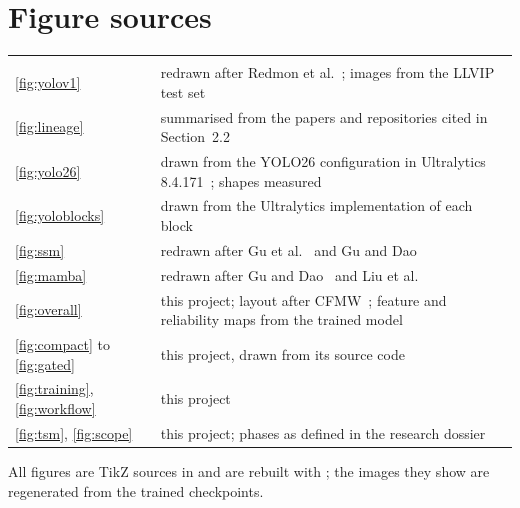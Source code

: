 \chapter{Figure sources}

\begin{longtable}{@{}P{2.6cm}P{11.2cm}@{}}
 &  \\
\ref{fig:yolov1} & redrawn after Redmon et al.~\cite{redmon2016yolo}; images from the LLVIP test set~\cite{jia2021llvip} \\
\ref{fig:lineage} & summarised from the papers and repositories cited in Section~2.2 \\
\ref{fig:yolo26} & drawn from the YOLO26 configuration in Ultralytics 8.4.171~\cite{yolo26_2026}; shapes measured \\
\ref{fig:yoloblocks} & drawn from the Ultralytics implementation of each block \\
\ref{fig:ssm} & redrawn after Gu et al.~\cite{gu2022s4} and Gu and Dao~\cite{gu2023mamba} \\
\ref{fig:mamba} & redrawn after Gu and Dao~\cite{gu2023mamba} and Liu et al.~\cite{liu2024vmamba} \\
\ref{fig:overall} & this project; layout after CFMW~\cite{li2025cfmw}; feature and reliability maps from the trained model \\
\ref{fig:compact} to \ref{fig:gated} & this project, drawn from its source code \\
\ref{fig:training}, \ref{fig:workflow} & this project \\
\ref{fig:tsm}, \ref{fig:scope} & this project; phases as defined in the research dossier \\
\end{longtable}

All figures are TikZ sources in  and are rebuilt with
; the images they show are regenerated from the trained checkpoints.
